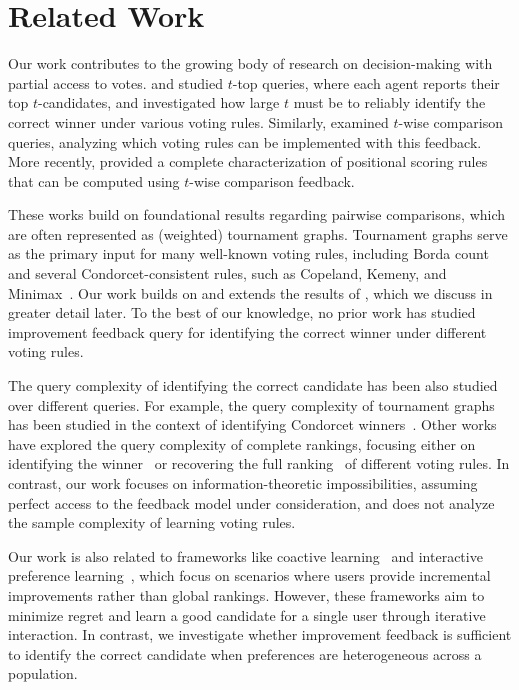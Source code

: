 \section{Related Work}
Our work contributes to the growing body of research on decision-making with partial access to votes.  \citet{filmus2014efficient} and \citet{oren2013efficient} studied \(t\)-top queries, where each agent reports their top \(t\)-candidates, and investigated how large \(t\) must be to reliably identify the correct winner under various voting rules. Similarly, \citet{bentert2020comparing} examined \(t\)-wise comparison queries, analyzing which voting rules can be implemented with this feedback. More recently, \citet{halpern2024computing} provided a complete characterization of positional scoring rules that can be computed using \(t\)-wise comparison feedback.  

These works build on foundational results regarding pairwise comparisons, which are often represented as (weighted) tournament graphs. Tournament graphs serve as the primary input for many well-known voting rules, including Borda count and several Condorcet-consistent rules, such as Copeland, Kemeny, and Minimax~\cite{brandt2016handbook}. Our work builds on and extends the results of \citet{halpern2024computing}, which we discuss in greater detail later. To the best of our knowledge, no prior work has studied improvement feedback query for identifying the correct winner under different voting rules. 

The query complexity of identifying the correct candidate has been also studied over different queries. For example, the query complexity of tournament graphs has been studied in the context of identifying Condorcet winners~\citep{procaccia2008note}. Other works have explored the query complexity of complete rankings, focusing either on identifying the winner~\cite{dey2015sample} or recovering the full ranking~\cite{micha2020can} of different voting rules. In contrast, our work focuses on information-theoretic impossibilities, assuming perfect access to the feedback model under consideration, and does not analyze the sample complexity of learning voting rules.

Our work is also related to frameworks like coactive learning~\citep{shivaswamy2015coactive} and interactive preference learning~\citep{tucker2024coactive}, which focus on scenarios where users provide incremental improvements rather than global rankings. However, these frameworks aim to minimize regret and learn a good candidate for a single user through iterative interaction. In contrast, we investigate whether improvement feedback is sufficient to identify the correct candidate when preferences are heterogeneous across a population.